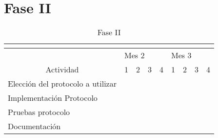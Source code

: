 \section{Fase II}
\begin{table}[h]
  \centering
  \label{my-label1}
  \begin{tabular}{|l|l|l|l|l|l|l|l|l|}
    \hline
    \multicolumn{9}{|c|}{\cellcolor[HTML]{FD6864}{\color[HTML]{000000} Fase II}}                                                                                                                                                                                                  \\ \hline
    \multicolumn{1}{|c|}{}                            & \multicolumn{4}{l|}{Mes 2} & \multicolumn{4}{l|}{Mes 3}                                                                                                                                                                   \\ \cline{2-9}
    \multicolumn{1}{|c|}{\multirow{-2}{*}{Actividad}} & 1                          & 2                          & 3                        & 4                        & 1                        & 2                        & 3                        & 4                        \\ \hline
    Elección del protocolo a utilizar                 & \cellcolor[HTML]{FFFFFF}   & \cellcolor[HTML]{FFFFFF}   & \cellcolor[HTML]{3166FF} & \cellcolor[HTML]{3166FF} & \cellcolor[HTML]{FFFFFF} & \cellcolor[HTML]{FFFFFF} & \cellcolor[HTML]{FFFFFF} & \cellcolor[HTML]{FFFFFF} \\ \hline

    Implementación  Protocolo                         & \cellcolor[HTML]{FFFFFF}   & \cellcolor[HTML]{FFFFFF}   & \cellcolor[HTML]{FFFFFF} & \cellcolor[HTML]{3166FF} & \cellcolor[HTML]{3166FF} & \cellcolor[HTML]{FFFFFF} & \cellcolor[HTML]{FFFFFF} & \cellcolor[HTML]{FFFFFF} \\ \hline
    Pruebas protocolo                                 & \cellcolor[HTML]{FFFFFF}   & \cellcolor[HTML]{FFFFFF}   & \cellcolor[HTML]{FFFFFF} & \cellcolor[HTML]{FFFFFF} & \cellcolor[HTML]{FFFFFF} & \cellcolor[HTML]{3166FF} & \cellcolor[HTML]{3166FF} & \cellcolor[HTML]{3166FF} \\ \hline
    Documentación                                     & \cellcolor[HTML]{FFFFFF}   & \cellcolor[HTML]{FFFFFF}   & \cellcolor[HTML]{34FF34} & \cellcolor[HTML]{34FF34} & \cellcolor[HTML]{34FF34} & \cellcolor[HTML]{34FF34} & \cellcolor[HTML]{34FF34} & \cellcolor[HTML]{34FF34} \\ \hline
  \end{tabular}
  \caption{Fase II}
\end{table}
\newpage

